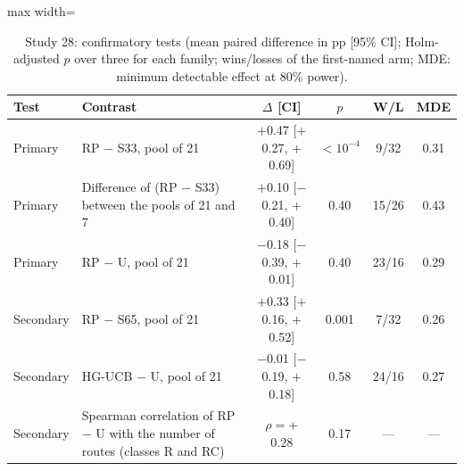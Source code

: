 \begin{table}[t]
\caption{Study 28: confirmatory tests (mean paired difference in pp [95\% CI]; Holm-adjusted $p$ over three for each family; wins/losses of the first-named arm; MDE: minimum detectable effect at 80\% power).}\label{tab:s28f}
\centering
\small
\begin{adjustbox}{max width=\linewidth}
\begin{tabular}{llcccc}
\toprule
Test & Contrast & $\Delta$ [CI] & $p$ & W/L & MDE \\
\midrule
Primary & RP $-$ S33, pool of 21 & $+$0.47 [$+$0.27, $+$0.69] & \ensuremath{<10^{-4}} & 9/32 & 0.31 \\
Primary & Difference of (RP $-$ S33) between the pools of 21 and 7 & $+$0.10 [$-$0.21, $+$0.40] & 0.40 & 15/26 & 0.43 \\
Primary & RP $-$ U, pool of 21 & $-$0.18 [$-$0.39, $+$0.01] & 0.40 & 23/16 & 0.29 \\
Secondary & RP $-$ S65, pool of 21 & $+$0.33 [$+$0.16, $+$0.52] & 0.001 & 7/32 & 0.26 \\
Secondary & HG-UCB $-$ U, pool of 21 & $-$0.01 [$-$0.19, $+$0.18] & 0.58 & 24/16 & 0.27 \\
Secondary & Spearman correlation of RP $-$ U with the number of routes (classes R and RC) & $\rho=$+$0.28$ & 0.17 & --- & --- \\
\bottomrule
\end{tabular}
\end{adjustbox}
\end{table}
